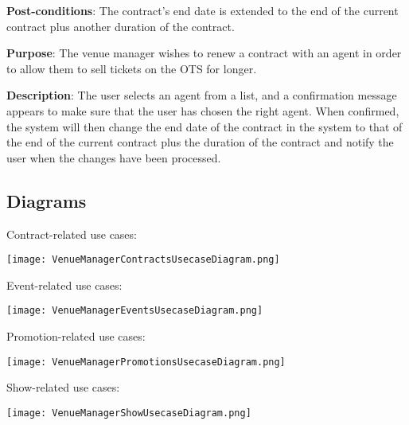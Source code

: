 \textbf{Post-conditions}: The contract's end date is extended to the
end of the current contract plus another duration of the contract.

\textbf{Purpose}: The venue manager wishes to renew a contract with
an agent in order to allow them to sell tickets on the OTS for longer.

\textbf{Description}: The user selects an agent from a list,
and a confirmation message appears to make sure that the user
has chosen the right agent. When confirmed, the system will
then change the end date of the contract in the system to that
of the end of the current contract plus the duration of the
contract and notify the user when the changes have been processed.

\subsection{Diagrams}
Contract-related use cases:

\texttt{[image: VenueManagerContractsUsecaseDiagram.png]}

Event-related use cases:

\texttt{[image: VenueManagerEventsUsecaseDiagram.png]}

Promotion-related use cases:

\texttt{[image: VenueManagerPromotionsUsecaseDiagram.png]}

Show-related use cases:

\texttt{[image: VenueManagerShowUsecaseDiagram.png]}
